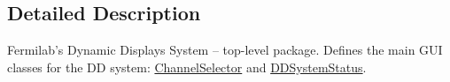 \subsection{Detailed Description}
Fermilab's Dynamic Displays System -- top-\/level package. Defines the main G\-U\-I classes for the D\-D system\-: \hyperlink{classgov_1_1fnal_1_1ppd_1_1dd_1_1ChannelSelector}{Channel\-Selector} and \hyperlink{classgov_1_1fnal_1_1ppd_1_1dd_1_1DDSystemStatus}{D\-D\-System\-Status}.